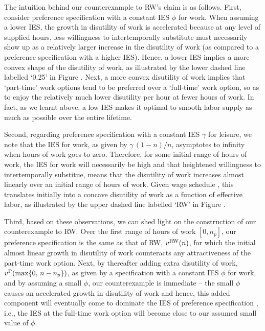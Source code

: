 The intuition behind our counterexample to RW's claim is as 
follows. First, consider preference specification 
with a constant IES $\phi$ for work. When assuming a lower IES, 
the growth in disutility of work is accelerated because at any 
level of supplied hours, less willingness to intertemporally 
substitute must necessarily show up as a relatively larger increase 
in the disutility of work (as compared to a preference specification
with a higher IES). Hence, a lower IES implies a more 
convex shape of the disutility of work, as illustrated by the lower
dashed line labelled `0.25' in Figure .
Next, a more convex disutility of work implies that `part-time' work 
options tend to be preferred over a `full-time' work option, so as
to enjoy the relatively much lower disutility per hour at
fewer hours of work. In fact, as we learnt above, a low IES makes
it optimal to smooth labor supply as much as possible over 
the entire lifetime. 

Second, regarding preference specification  with a 
constant IES $\gamma$ for leisure, we note that the IES for work, as 
given by $\gamma\, (1-n)/n$, asymptotes to infinity when hours of work 
goes to zero. Therefore, for some initial range of hours of work, the 
IES for work will necessarily be
high and that heightened willingness to intertemporally substitue,
means that the disutility of work increases almost linearly over
an initial range of hours of work. Given wage schedule 
, this translates initially into a concave disutility 
of work as a function of effective labor, as illustrated by the 
upper dashed line labelled `RW' in Figure .

Third, based on these observations, we can shed light on 
the construction of our counterexample to RW. 
Over the first range of hours of work $[0, n_p]$, our preference
specification  is the same as that of RW, 
$v^{\rm RW}(n)$, for which the initial almost linear growth in 
disutility of work counteracts any attractiveness of the part-time 
work option. Next, by thereafter adding extra disutility of work, 
$v^{\rm P}( \max \{0,\, n-n_p \} )$, as given by 
a specification with a constant IES $\phi$ for
work, and by assuming a small $\phi$, our counterexample
is immediate -- the small $\phi$ causes an 
accelerated growth in disutility of work and hence, this added
component will eventually come to dominate the IES of
preference specification , i.e.,  
the IES at the full-time work option will become close to our 
assumed small value of $\phi$.


